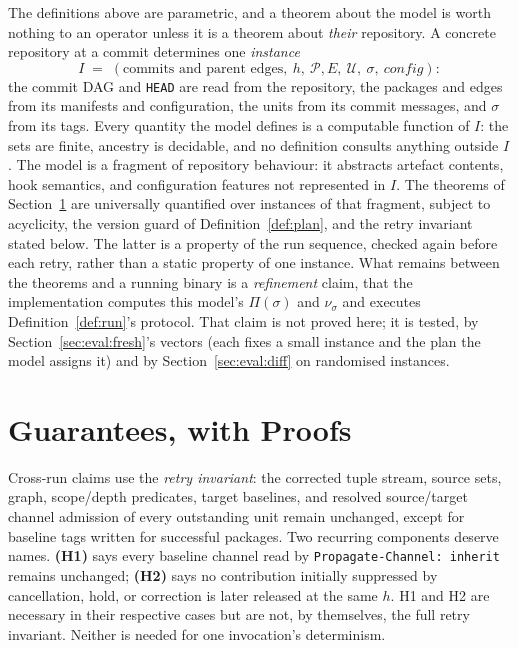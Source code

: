 \documentclass[sigconf,nonacm]{acmart}
\newcommand{\code}[1]{\texttt{#1}}
\begin{document}
The definitions above are parametric, and a theorem about the model
is worth nothing to an operator unless it is a theorem about
\emph{their} repository. A concrete repository at a commit determines
one \emph{instance}
\[
  I \;=\; (\text{commits and parent edges},\ h,\
           \mathcal{P}, E,\ \mathcal{U},\ \sigma,\ \mathit{config}):
\]
the commit DAG and \code{HEAD} are read from the repository, the
packages and edges from its manifests and configuration, the units
from its commit messages, and $\sigma$ from its tags. Every quantity
the model defines is a computable function of $I$: the sets are
finite, ancestry is decidable, and no definition consults anything
outside $I$. The model is a fragment of repository behaviour: it abstracts
artefact contents, hook semantics, and configuration features not represented
in $I$. The theorems of Section~\ref{sec:guarantees} are universally
quantified over instances of that fragment, subject to acyclicity, the
version guard of Definition~\ref{def:plan}, and the retry invariant stated
below. The latter is a property of the run sequence, checked again before
each retry, rather than a static property of one instance. What remains between the theorems and a running binary is a
\emph{refinement} claim, that the implementation computes this
model's $\Pi(\sigma)$ and $\nu_\sigma$ and executes
Definition~\ref{def:run}'s protocol. That claim is not proved here;
it is tested, by Section~\ref{sec:eval:fresh}'s vectors (each
fixes a small instance and the plan the model assigns it) and by
Section~\ref{sec:eval:diff} on randomised instances.

\section{Guarantees, with Proofs}
\label{sec:guarantees}

Cross-run claims use the \emph{retry invariant}: the corrected tuple
stream, source sets, graph, scope/depth predicates, target baselines, and
resolved source/target channel admission of every outstanding unit remain
unchanged, except for baseline tags written for successful packages.
Two recurring components deserve names. \textbf{(H1)} says every baseline
channel read by \code{Propagate-Channel: inherit} remains unchanged;
\textbf{(H2)} says no contribution initially suppressed by cancellation,
hold, or correction is later released at the same $h$. H1 and H2 are
necessary in their respective cases but are not, by themselves, the full
retry invariant. Neither is needed for one invocation's determinism.
\end{document}
